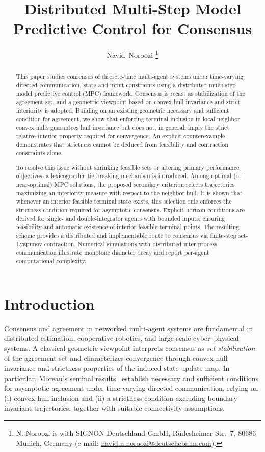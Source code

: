 \documentclass[12pt,draftcls,onecolumn]{IEEEtran}
\title{Distributed Multi-Step Model Predictive Control for Consensus}
\author{Navid~Noroozi%
\thanks{N. Noroozi is with SIGNON Deutschland GmbH, R\"udesheimer Str.~7,
80686 Munich, Germany (e-mail: \href{mailto:navid.n.noroozi@deutschebahn.com}{navid.n.noroozi@deutschebahn.com}).}%
}
\begin{document}
\maketitle
\begin{abstract}
This paper studies consensus of discrete-time multi-agent systems under time-varying directed communication, state and input constraints using a distributed multi-step model predictive control (MPC) framework. 
Consensus is recast as stabilization of the agreement set, and a geometric viewpoint based on convex-hull invariance and strict interiority is adopted. Building on an existing geometric necessary and sufficient condition for agreement, we show that enforcing terminal inclusion in local neighbor convex hulls guarantees hull invariance but does not, in general, imply the strict relative-interior property required for convergence. An explicit counterexample demonstrates that strictness cannot be deduced from feasibility and contraction constraints alone.

To resolve this issue without shrinking feasible sets or altering primary performance objectives, a lexicographic tie-breaking mechanism is introduced. Among optimal (or near-optimal) MPC solutions, the proposed secondary criterion selects trajectories maximizing an interiority measure with respect to the neighbor hull. It is shown that whenever an interior feasible terminal state exists, this selection rule enforces the strictness condition required for asymptotic consensus. Explicit horizon conditions are derived for single- and double-integrator agents with bounded inputs, ensuring feasibility and automatic existence of interior feasible terminal points. The resulting scheme provides a distributed and implementable route to consensus via finite-step set-Lyapunov contraction. Numerical simulations with distributed inter-process communication illustrate monotone diameter decay and report per-agent computational complexity.
\end{abstract}

\tableofcontents

\section{Introduction}

Consensus and agreement in networked multi-agent systems are fundamental in distributed estimation, cooperative robotics, and large-scale cyber--physical systems.
A classical geometric viewpoint interprets consensus as \emph{set stabilization} of the agreement set and characterizes convergence through convex-hull invariance and strictness properties of the induced state update map.
In particular, Moreau's seminal results~\cite{Moreau.2005} establish necessary and sufficient conditions for asymptotic agreement under time-varying directed communication, relying on (i) convex-hull inclusion and (ii) a strictness condition excluding boundary-invariant trajectories, together with suitable connectivity assumptions.
\end{document}
